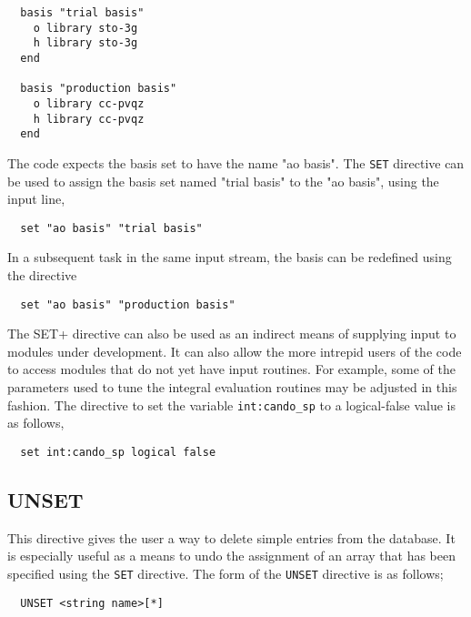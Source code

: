 \begin{verbatim}
  basis "trial basis"
    o library sto-3g
    h library sto-3g
  end

  basis "production basis"
    o library cc-pvqz
    h library cc-pvqz
  end
\end{verbatim}

The code expects the basis set to have the name "ao basis".
The \verb+SET+ directive can be used to assign the basis set named
"trial basis" to the "ao basis", using the input line,

\begin{verbatim}
  set "ao basis" "trial basis"
\end{verbatim}

In a subsequent task in the same input stream, the basis can be redefined
using the directive

\begin{verbatim}
  set "ao basis" "production basis"
\end{verbatim}

The \+SET+ directive can also be used as an indirect means of 
supplying input to modules under development.  It can also allow the more 
intrepid users of the code to access modules that do not yet have
input routines.  For example, some of the parameters used to tune the
integral evaluation routines may be adjusted in this fashion.  The directive 
to set the variable \verb+int:cando_sp+ to a 
logical-false value is as follows,
 
\begin{verbatim}
  set int:cando_sp logical false
\end{verbatim}

\subsection{UNSET}
\label{sec:unset}

This directive gives the user a way to delete simple entries from the
database.  It is especially useful as a  means to undo the assignment 
of an array that has been specified using the \verb+SET+ directive.  
The form of the \verb+UNSET+ directive is as follows;

\begin{verbatim}
  UNSET <string name>[*]
\end{verbatim}

